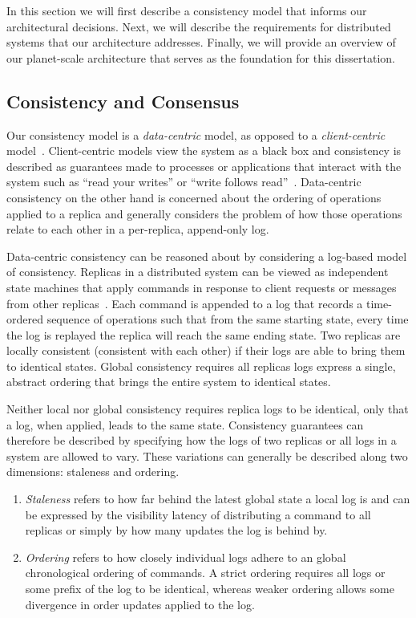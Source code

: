 In this section we will first describe a consistency model that informs our architectural decisions.
Next, we will describe the requirements for distributed systems that our architecture addresses.
Finally, we will provide an overview of our planet-scale architecture that serves as the foundation for this dissertation.

\subsection{Consistency and Consensus}
\label{ch02_consistency}

Our consistency model is a \textit{data-centric} model, as opposed to a \textit{client-centric} model~\cite{bermbach_consistency_2013}.
Client-centric models view the system as a black box and consistency is described as guarantees made to processes or applications that interact with the system such as ``read your writes'' or ``write follows read''~\cite{eventual_consistency}.
Data-centric consistency on the other hand is concerned about the ordering of operations applied to a replica and generally considers the problem of how those operations relate to each other in a per-replica, append-only log.

Data-centric consistency can be reasoned about by considering a log-based model of consistency.
Replicas in a distributed system can be viewed as independent state machines that apply commands in response to client requests or messages from other replicas~\cite{state_machine_approach}.
Each command is appended to a log that records a time-ordered sequence of operations such that from the same starting state, every time the log is replayed the replica will reach the same ending state.
Two replicas are locally consistent (consistent with each other) if their logs are able to bring them to identical states.
Global consistency requires all replicas logs express a single, abstract ordering that brings the entire system to identical states.

Neither local nor global consistency requires replica logs to be identical, only that a log, when applied, leads to the same state.
Consistency guarantees can therefore be described by specifying how the logs of two replicas or all logs in a system are allowed to vary.
These variations can generally be described along two dimensions: staleness and ordering.

\begin{enumerate}
    \item \emph{Staleness} refers to how far behind the latest global state a local log is and can be expressed by the visibility latency of distributing a command to all replicas or simply by how many updates the log is behind by.
    \item \emph{Ordering} refers to how closely individual logs adhere to an global chronological ordering of commands. A strict ordering requires all logs or some prefix of the log to be identical, whereas weaker ordering allows some divergence in order updates applied to the log.
\end{enumerate}

